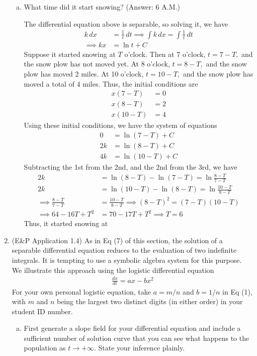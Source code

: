 \documentclass{article}
\begin{document}
\begin{enumerate}
\begin{enumerate}[(a)]
			\item What time did it start snowing? (Answer: 6 A.M.)
				\begin{soln}
					The differential equation above is separable, so solving it, we have
					\begin{align*}
						k\, dx &= \frac{1}{t}\, dt \implies \int k\, dx = \int \frac{1}{t}\, dt \\
						\implies kx &= \ln t + C
					\end{align*}
					Suppose it started snowing at $T$ o'clock. Then at 7 o'clock, $t=7-T,$ and the snow plow has not moved yet. At 8 o'clock, $t=8-T,$ and the snow plow has moved 2 miles. At 10 o'clock, $t=10-T,$ and the snow plow has moved a total of 4 miles. Thus, the initial conditions are
					\begin{align*}
						x(7-T) &= 0 \\
						x(8-T) &= 2 \\
						x(10-T) &= 4
					\end{align*}
					Using these initial conditions, we have the system of equations
					\begin{align*}
						0 &= \ln (7-T) + C \\
						2k &= \ln (8-T) + C \\
						4k &= \ln(10-T) + C
					\end{align*}
					Subtracting the 1st from the 2nd, and the 2nd from the 3rd, we have
					\begin{align*}
						2k &= \ln (8-T) - \ln (7-T) = \ln \frac{8-T}{7-T} \\
						2k &= \ln (10-T) - \ln(8-T) = \ln \frac{10-T}{8-T} \\
						\implies \frac{8-T}{7-T} &= \frac{10-T}{8-T} \implies (8-T)^2 = (7-T)(10-T) \\
						\implies 64-16T+T^2 &= 70-17T+T^2 \implies T = 6
					\end{align*}
					Thus, it started snowing at 
				\end{soln}

		\end{enumerate}

	\item (E\&P Application 1.4) As in Eq (7) of this section, the solution of a separable differential equation reduces to the evaluation of two indefinite integrals. It is tempting to use a symbolic algebra system for this purpose. We illustrate this approach using the logistic differential equation
		\begin{align*}
			\frac{dx}{dt} = ax-bx^2 \tag{1}
		\end{align*}
		For your own personal logistic equation, take $a=m/n$ and $b=1/n$ in Eq (1), with $m$ and $n$ being the largest two distinct digits (in either order) in your student ID number.
		\begin{enumerate}[(a)]
			\item First generate a slope field for your differential equation and include a sufficient number of solution curve that you can see what happens to the population as $t\to+\infty.$ State your inference plainly.


\end{enumerate}
\end{enumerate}
\end{document}
